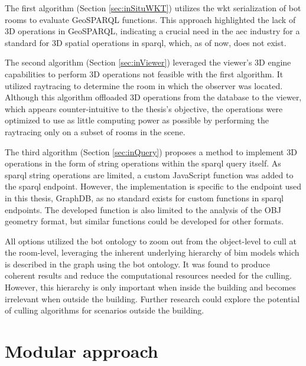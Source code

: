 The first algorithm (Section \ref{sec:inSituWKT}) utilizes the \ac{wkt} serialization of \ac{bot} rooms to evaluate GeoSPARQL functions. This approach highlighted the lack of 3D operations in GeoSPARQL, indicating a crucial need in the \ac{aec} industry for a standard for 3D spatial operations in \ac{sparql}, which, as of now, does not exist.

The second algorithm (Section \ref{sec:inViewer}) leveraged the viewer's 3D engine capabilities to perform 3D operations not feasible with the first algorithm. It utilized raytracing to determine the room in which the observer was located. Although this algorithm offloaded 3D operations from the database to the viewer, which appears counter-intuitive to the thesis's objective, the operations were optimized to use as little computing power as possible by performing the raytracing only on a subset of rooms in the scene.

The third algorithm (Section \ref{sec:inQuery}) proposes a method to implement 3D operations in the form of string operations within the \ac{sparql} query itself. As \ac{sparql} string operations are limited, a custom JavaScript function was added to the \ac{sparql} endpoint. However, the implementation is specific to the endpoint used in this thesis, GraphDB, as no standard exists for custom functions in \ac{sparql} endpoints. The developed function is also limited to the analysis of the OBJ geometry format, but similar functions could be developed for other formats.

All options utilized the \ac{bot} ontology to zoom out from the object-level to cull at the room-level, leveraging the inherent underlying hierarchy of \ac{bim} models which is described in the graph using the \ac{bot} ontology. It was found to produce coherent results and reduce the computational resources needed for the culling. However, this hierarchy is only important when inside the building and becomes irrelevant when outside the building. Further research could explore the potential of culling algorithms for scenarios outside the building.

\section{Modular approach}

